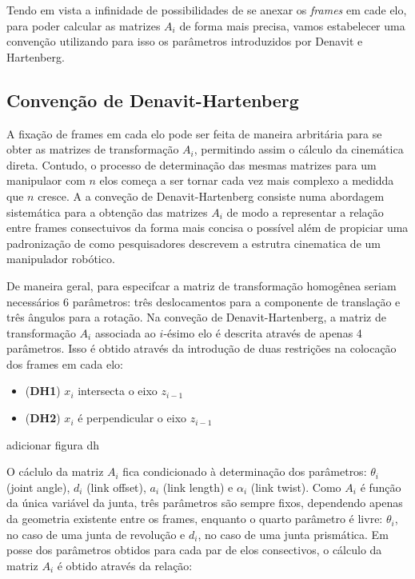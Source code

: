 Tendo em vista a infinidade de possibilidades de se anexar os \emph{frames} em
cade elo, para poder calcular as matrizes $A_i$ de forma mais precisa, vamos
estabelecer uma convenção utilizando para isso os parâmetros introduzidos por
Denavit e Hartenberg.

\subsection{Convenção de Denavit-Hartenberg}

A fixação de frames em cada elo pode ser feita de maneira arbritária para se
obter as matrizes de transformação $A_i$, permitindo assim o cálculo da
cinemática direta. Contudo, o processo de determinação das mesmas matrizes para
um manipulaor com $n$ elos começa a ser tornar cada vez mais complexo a medidda
que $n$ cresce. A a conveção de Denavit-Hartenberg consiste numa abordagem
sistemática para a obtenção das matrizes $A_i$ de modo a representar a relação
entre frames consectuivos da forma mais concisa o possível além de propiciar
uma padronização de como pesquisadores descrevem a estrutra cinematica de um
manipulador robótico.

De maneira geral, para especifcar a matriz de transformação homogênea seriam
necessários 6 parâmetros: três deslocamentos para a componente de translação e
três ângulos para a rotação. Na conveção de Denavit-Hartenberg, a matriz de
transformação $A_i$ associada ao $i$-ésimo elo é descrita através de apenas 4
parâmetros. Isso é obtido através da introdução de duas restrições na colocação
dos frames em cada elo:

\begin{itemize}
    \item (\textbf{DH1}) $x_i$ intersecta o eixo $z_{i-1}$
    \item (\textbf{DH2}) $x_i$ é perpendicular o eixo $z_{i-1}$
\end{itemize}

adicionar figura dh

O cáclulo da matriz $A_i$ fica condicionado à determinação dos parâmetros:
$\theta_i$ (joint angle), $d_i$ (link offset), $a_i$ (link length) e $\alpha_i$
(link twist). Como $A_i$ é função da única variável da junta, três parâmetros
são sempre fixos, dependendo apenas da geometria existente entre os frames,
enquanto o quarto parâmetro é livre: $\theta_i$, no caso de uma junta de
revolução e $d_i$, no caso de uma junta prismática. Em posse dos parâmetros
obtidos para cada par de elos consectivos, o cálculo da matriz $A_i$ é obtido
através da relação:

